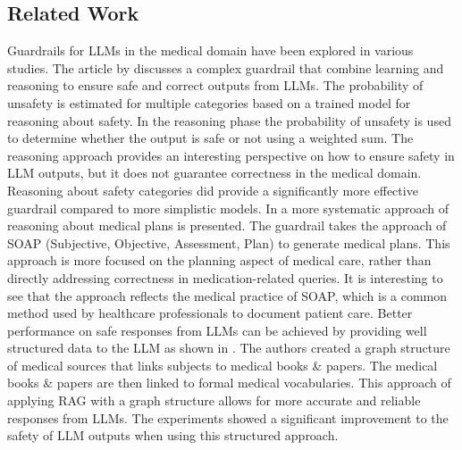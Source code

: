 %

\subsection{Related Work}
Guardrails for LLMs in the medical domain have been explored in various studies.
The article by \citep{kang2024r} discusses a complex guardrail that combine learning and reasoning to ensure safe and correct outputs from LLMs.
The probability of unsafety is estimated for multiple categories based on a trained model for reasoning about safety.
In the reasoning phase the probability of unsafety is used to determine whether the output is safe or not using a weighted sum.
The reasoning approach provides an interesting perspective on how to ensure safety in LLM outputs, but it does not guarantee correctness in the medical domain.
Reasoning about safety categories did provide a significantly more effective guardrail compared to more simplistic models.
In \citep{hsu2025medplan} a more systematic approach of reasoning about medical plans is presented.
The guardrail takes the approach of SOAP (Subjective, Objective, Assessment, Plan) to generate medical plans.
This approach is more focused on the planning aspect of medical care, rather than directly addressing correctness in medication-related queries.
It is interesting to see that the approach reflects the medical practice of SOAP, which is a common method used by healthcare professionals to document patient care.
Better performance on safe responses from LLMs can be achieved by providing well structured data to the LLM as shown in \citep{wu2024medical}.
The authors created a graph structure of medical sources that links subjects to medical books & papers.
The medical books & papers are then linked to formal medical vocabularies.
This approach of applying RAG with a graph structure allows for more accurate and reliable responses from LLMs.
The experiments showed a significant improvement to the safety of LLM outputs when using this structured approach.
